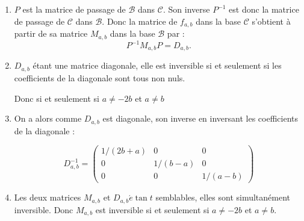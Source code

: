 \begin{correction}
\begin{enumerate}
\begin{enumerate}
\item $P$ est la matrice de passage de $\mathcal{B}$ dans $\mathcal{C}.$ Son
inverse $P^{-1}$ est donc la matrice de passage de $\mathcal{C}$ dans $%
\mathcal{B}.$ Donc la matrice de $f_{a,b}$ dans la base $\mathcal{C}$
s'obtient \`{a} partir de sa matrice $M_{a,b}$ dans la base $\mathcal{B}$
par : 
\begin{equation*}
P^{-1}M_{a,b}P=D_{a,b}.
\end{equation*}

\item $D_{a,b}$ \'{e}tant une matrice diagonale, elle est inversible si et
seulement si les coefficients de la diagonale sont tous non nuls.

Donc si et seulement si $a\neq -2b$ et $a\neq b$

\item On a alors comme $D_{a,b}$ est diagonale, son inverse en inversant les
coefficients de la diagonale :

\begin{equation*}
D_{a,b}^{-1}=\left( 
\begin{array}{ccc}
1/\left( 2b+a\right) & 0 & 0 \\ 
0 & 1/\left( b-a\right) & 0 \\ 
0 & 0 & 1/\left( a-b\right)%
\end{array}%
\right)
\end{equation*}

\item Les deux matrices $M_{a,b}$ et $D_{a,b}\acute{e}\tan t$ semblables,
elles sont simultan\'{e}ment inversible. Donc $M_{a,b}$ est inversible si et
seulement si $a\neq -2b$ et $a\neq b.$
\end{enumerate}


\end{enumerate}

\end{correction}